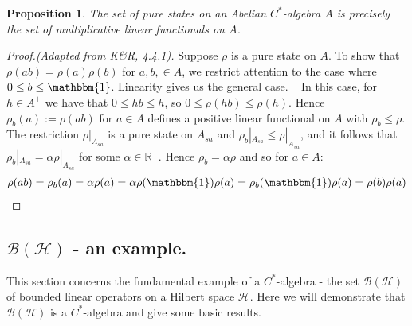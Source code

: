\documentclass[12pt,a4paper]{amsart}
\theoremstyle{plain}
\newtheorem{prop}{Proposition}
\theoremstyle{definition}
\renewcommand{\H}{\mathcal{H}}
\newcommand{\B}{\mathcal{B}}
\newcommand{\1}{\mathbbm{1}}
\newcommand{\R}{\mathbb{R}}
\begin{document}
\begin{prop}
	The set of pure states on an Abelian $C^\ast$-algebra $A$ is precisely the set 
	of multiplicative linear functionals on $A$.
\end{prop}
\begin{proof}[Proof.(Adapted from K\&R, 4.4.1)]
	Suppose $\rho$ is a pure state on $A$. To show that $\rho(ab)=\rho(a)\rho(b)$ for $a,b,\in A$,
	we restrict attention to the case where $0\leq b\leq\1$. Linearity gives us the general case. ~%
	In this case, for $h\in A^+$ we have that $0\leq hb\leq h$, so $0\leq\rho(hb)\leq\rho(h)$.
	Hence $\rho_b(a):=\rho(ab)$ for $a\in A$ defines a positive linear functional on $A$ 
	with $\rho_b\leq\rho$. 
	The restriction $\rho|_{A_{sa}}$ is a pure state on $A_{sa}$ %
	and $\rho_b|_{A_{sa}} \leq \rho|_{A_{sa}}$, and it follows  %
	that $\rho_b|_{A_{sa}} = \alpha \rho|_{A_{sa}}$ for some $\alpha \in \R^+$.
	Hence $\rho_b = \alpha\rho$  and so for $a\in A$:
	\begin{align*}
		\rho(ab) = \rho_b(a) = \alpha\rho(a) = 
							\alpha\rho(\1)\rho(a) = \rho_b(\1)\rho(a) = \rho(b)\rho(a)
	\end{align*}
	
	
\end{proof}






\subsection{$\B(\H)$ - an example.}
This section concerns the fundamental example of a $C^\ast$-algebra - the set $\B(\H)$ of bounded 
linear operators on a Hilbert space $\H$.  
Here we will demonstrate that $\B(\H)$ is a $C^\ast$-algebra and give some basic results.
\end{document}
